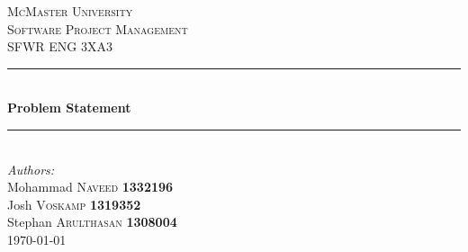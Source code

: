 \documentclass[12pt]{article}
\begin{document}
	\sloppy

	\begin{titlepage}
		\color{red}
		\newcommand{\HRule}{\rule{\linewidth}{0.5mm}} %

		\center %


		\textsc{\LARGE McMaster University}\\[1.5cm] %
		\textsc{\Large Software Project Management}\\[0.5cm] %
		\textsc{\large SFWR ENG 3XA3}\\[0.5cm] %


		\HRule \\[0.4cm]
		{ \huge \bfseries Problem Statement}\\[0.4cm] %
		\HRule \\[1.5cm]




		\Large \emph{Authors:}\\
		Mohammad \textsc{Naveed} \textbf{1332196} \\ %
		Josh \textsc{Voskamp} \textbf{1319352} \\
		Stephan \textsc{Arulthasan} \textbf{1308004} \\[3cm]

		{\large \today}\\[3cm] %


\end{titlepage}
\end{document}
